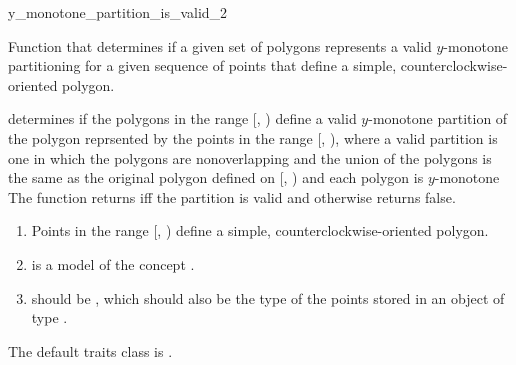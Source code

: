 \renewcommand\ccRefPageBegin{\ccParDims\cgalColumnLayout\begin{ccAdvanced}}
\renewcommand\ccRefPageEnd{\ccParDims\cgalColumnLayout\end{ccAdvanced}}
\begin{ccRefFunction}{y_monotone_partition_is_valid_2}

\ccDefinition
Function that determines if a given set of polygons represents
a valid $y$-monotone partitioning for a given sequence of points that 
define a simple, counterclockwise-oriented polygon.  


{
determines if the polygons in the range [, )
define a valid $y$-monotone partition of the polygon reprsented by the points 
in the 
range [, ), where a valid partition is one in
which the polygons are nonoverlapping and the union of the polygons is the 
same as the original polygon defined on [, )
and each polygon is $y$-monotone
The function returns  iff the partition is valid and otherwise
returns false.
}

\begin{enumerate}
    \item Points in the range [, ) define
          a simple, counterclockwise-oriented polygon.
    \item {} is a model of the concept 
          .
    \item {} should be ,
          which should also be the type of the points stored in an object
          of type .
\end{enumerate}

The default traits class  is .%


\end{ccRefFunction}
